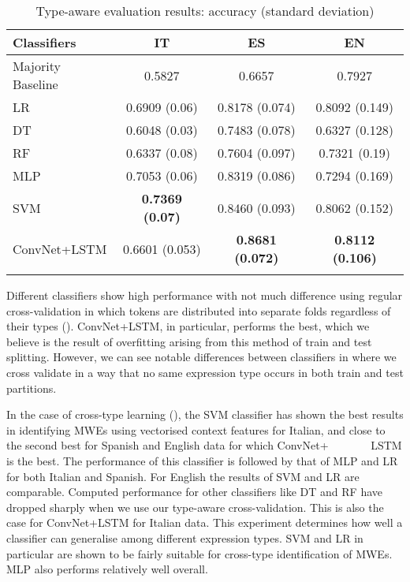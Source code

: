 \documentclass[output=paper
,modfonts
,nonflat]{langsci/langscibook}
\begin{document}
\begin{table}[!ht]
\caption{Type-aware evaluation results: accuracy (standard deviation)}
\label{tab:typeaware}
 \begin{tabular}{l|ccc} 
  \lsptoprule
  Classifiers & IT & ES & EN  \\
  \midrule
   Majority Baseline & 0.5827 & 0.6657 & 0.7927\\
   LR & 0.6909 (0.06)  & 0.8178 (0.074) & 0.8092 (0.149)  \\
   DT  & 0.6048 (0.03) & 0.7483 (0.078) & 0.6327 (0.128) \\
   RF & 0.6337 (0.08) & 0.7604 (0.097) & 0.7321 (0.19) \\
   MLP  & 0.7053 (0.06) & 0.8319 (0.086) & 0.7294 (0.169) \\
   SVM  & \textbf{0.7369 (0.07)} & 0.8460 (0.093) & 0.8062 (0.152) \\
   ConvNet+LSTM  & 0.6601 (0.053) & \textbf{0.8681 (0.072)} & \textbf{0.8112 (0.106)} \\
  \lspbottomrule
 \end{tabular}
\end{table}

Different classifiers show high performance with not much difference using regular cross-validation in which tokens are distributed into separate folds regardless of their types (). ConvNet+LSTM, in particular, performs the best, %
which we believe is the result of overfitting arising from this method of train and test splitting. 
However, we can see notable differences between classifiers in  where we cross validate in a way that no same expression type occurs in both train and test partitions. %

In the case of cross-type learning (), the SVM classifier has shown the best results in identifying MWEs using vectorised context features for Italian, and close to the second best for Spanish and English data for which ConvNet+ ~~~~~~~LSTM is the best. The performance of this classifier is followed by that of MLP and LR for both Italian and Spanish. For English the results of SVM and LR are comparable. Computed performance for other classifiers like DT and RF have dropped sharply when we use our type-aware cross-validation.
This is also the case for ConvNet+LSTM for Italian data.
This experiment determines how well a classifier can generalise among different expression types. SVM and LR in particular are shown to be fairly suitable for cross-type identification of MWEs. MLP also performs relatively well overall. 
\end{document}
